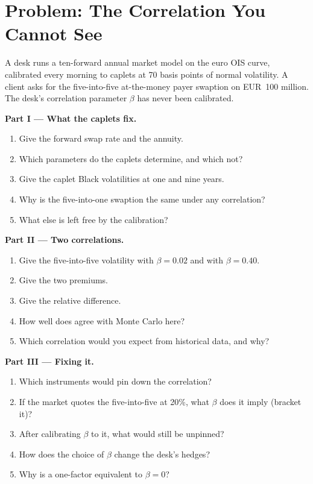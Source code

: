 \section{Problem: The Correlation You Cannot See}

\begin{problem}\label{pb:rc:forward-rate-and-market-models:1}
A desk runs a ten-forward annual market model on the euro OIS curve, calibrated
every morning to caplets at 70 basis points of normal volatility. A client
asks for the five-into-five at-the-money payer swaption on EUR~100 million. The
desk's correlation parameter $\beta$ has never been calibrated.

\medskip\noindent\textbf{Part I --- What the caplets fix.}
\begin{enumerate}
\item Give the forward swap rate and the annuity.
\item Which parameters do the caplets determine, and which not?
\item Give the caplet Black volatilities at one and nine years.
\item Why is the five-into-one swaption the same under any correlation?
\item What else is left free by the calibration?
\end{enumerate}

\medskip\noindent\textbf{Part II --- Two correlations.}
\begin{enumerate}[resume]
\item Give the five-into-five volatility with $\beta = 0.02$ and with $\beta=0.40$.
\item Give the two premiums.
\item Give the relative difference.
\item How well does  agree with Monte Carlo here?
\item Which correlation would you expect from historical data, and why?
\end{enumerate}

\medskip\noindent\textbf{Part III --- Fixing it.}
\begin{enumerate}[resume]
\item Which instruments would pin down the correlation?
\item If the market quotes the five-into-five at 20\%, what $\beta$ does it imply
(bracket it)?
\item After calibrating $\beta$ to it, what would still be unpinned?
\item How does the choice of $\beta$ change the desk's hedges?
\item Why is a one-factor  equivalent to $\beta=0$?
\end{enumerate}


\end{problem}
